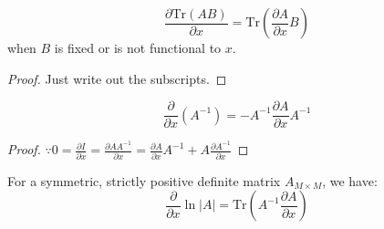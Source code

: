 \begin{conclusion}
\begin{equation}
\frac{\partial{}\text{Tr}(AB)}{\partial{}x}=\text{Tr}(\frac{\partial{}A}{\partial{}x}B)
\label{eqn:tediousequation}
\end{equation}
when $B$ is fixed or is not functional to $x$.
\end{conclusion}
\begin{proof}
Just write out the subscripts.
\end{proof}
\begin{conclusion}
\begin{equation}
\frac{\partial}{\partial{}x}(A^{-1})=-A^{-1}\frac{\partial{}A}{\partial{}x}A^{-1}
\label{eqn:dxAinv}
\end{equation}
\begin{proof}
$\because{}0=\frac{\partial{}I}{\partial{}x}=\frac{\partial{}AA^{-1}}{\partial{}x}=\frac{\partial{}A}{\partial{}x}A^{-1}+A\frac{\partial{}A^{-1}}{\partial{x}}$
\end{proof}
\end{conclusion}
\begin{conclusion}
For a symmetric, strictly positive definite matrix $A_{M\times{}M}$, we have:
\begin{equation}
\frac{\partial}{\partial{}x}\ln{}\vert{}A\vert{}=\text{Tr}(A^{-1}\frac{\partial{}A}{\partial{}x})
\label{eqn:appc22}
\end{equation}
\end{conclusion}
